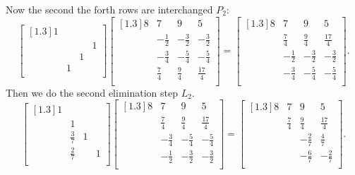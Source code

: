 Now the second the forth rows are interchanged $P_2$: 
\[
    \begin{bmatrix}[1.3]
        1 &  &  &   \\
         &  &  &  1 \\
         &  & 1 &   \\
         & 1 &  &   \\
    \end{bmatrix}  
    \begin{bmatrix}[1.3]
        8 & 7 & 9 &  5 \\
         & -\frac{1}{2} & -\frac{3}{2} &  -\frac{3}{2} \\
         & -\frac{3}{4} & -\frac{5}{4} &  -\frac{5}{4} \\
         & \frac{7}{4} & \frac{9}{4} &  \frac{17}{4} \\
    \end{bmatrix}
    = 
    \begin{bmatrix}[1.3]
        8 & 7 & 9 &  5 \\
        & \frac{7}{4} & \frac{9}{4} &  \frac{17}{4} \\
         & -\frac{1}{2} & -\frac{3}{2} &  -\frac{3}{2} \\
         & -\frac{3}{4} & -\frac{5}{4} &  -\frac{5}{4} \\
    \end{bmatrix}
    .
\]
Then we do the second elimination step $L_2$. 
\[
    \begin{bmatrix}[1.3] 
        1 &  &  &   \\
         & 1 &  &   \\
         & \frac{3}{7} & 1 &   \\
         & \frac{2}{7} &  &  1 \\
    \end{bmatrix} \begin{bmatrix}[1.3] 
        8 & 7 & 9 &  5 \\
         & \frac{7}{4} & \frac{9}{4} &  \frac{17}{4} \\
         & -\frac{3}{4} & -\frac{5}{4} &  -\frac{5}{4} \\
         & -\frac{1}{2} & -\frac{3}{2} &  -\frac{3}{2} \\
    \end{bmatrix} = 
    \begin{bmatrix}[1.3] 
        8 & 7 & 9 &  5 \\
         & \frac{7}{4} & \frac{9}{4} &  \frac{17}{4} \\
         &  & -\frac{2}{7} &  \frac{4}{7} \\
         &  & -\frac{6}{7} &  -\frac{2}{7} \\
    \end{bmatrix}. 
\]
